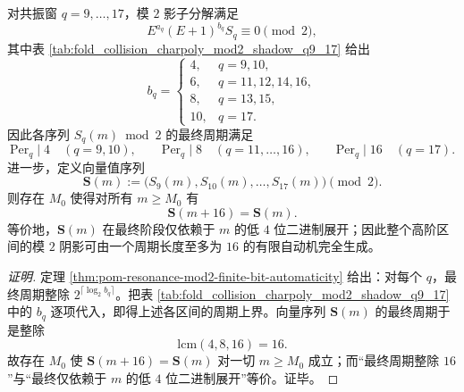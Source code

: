 \begin{conclusion}[高阶碰撞矩的模 \texorpdfstring{$2$}{2} 阴影在 \texorpdfstring{$q=9,\dots,17$}{q=9,...,17} 上完全有限自动机化]\label{con:xi-terminal-high-order-collision-mod2-automaticity}
对共振窗 \(q=9,\dots,17\)，模 \(2\) 影子分解满足
\[
E^{a_q}(E+1)^{b_q}S_q\equiv 0\pmod 2,
\]
其中表 \ref{tab:fold_collision_charpoly_mod2_shadow_q9_17} 给出
\[
b_q=
\begin{cases}
4, & q=9,10,\\
6, & q=11,12,14,16,\\
8, & q=13,15,\\
10, & q=17.
\end{cases}
\]
因此各序列 \(S_q(m)\bmod 2\) 的最终周期满足
\[
\mathrm{Per}_q\mid 4\quad(q=9,10),\qquad
\mathrm{Per}_q\mid 8\quad(q=11,\dots,16),\qquad
\mathrm{Per}_q\mid 16\quad(q=17).
\]
进一步，定义向量值序列
\[
\mathbf S(m):=\bigl(S_9(m),S_{10}(m),\dots,S_{17}(m)\bigr)\pmod 2.
\]
则存在 \(M_0\) 使得对所有 \(m\ge M_0\) 有
\[
\mathbf S(m+16)=\mathbf S(m).
\]
等价地，\(\mathbf S(m)\) 在最终阶段仅依赖于 \(m\) 的低 \(4\) 位二进制展开；因此整个高阶区间的模 \(2\) 阴影可由一个周期长度至多为 \(16\) 的有限自动机完全生成。
\end{conclusion}
\begin{proof}[证明]
定理 \ref{thm:pom-resonance-mod2-finite-bit-automaticity} 给出：对每个 \(q\)，最终周期整除 \(2^{\lceil\log_2 b_q\rceil}\)。把表 \ref{tab:fold_collision_charpoly_mod2_shadow_q9_17} 中的 \(b_q\) 逐项代入，即得上述各区间的周期上界。向量序列 \(\mathbf S(m)\) 的最终周期于是整除
\[
\mathrm{lcm}(4,8,16)=16.
\]
故存在 \(M_0\) 使 \(\mathbf S(m+16)=\mathbf S(m)\) 对一切 \(m\ge M_0\) 成立；而“最终周期整除 \(16\)”与“最终仅依赖于 \(m\) 的低 \(4\) 位二进制展开”等价。证毕。
\end{proof}

